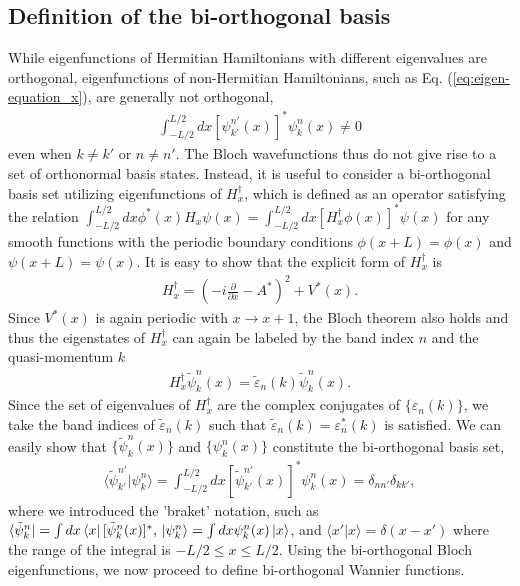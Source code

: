 \documentclass[prb,superscriptaddress,floatfix,twocolumn,showpacs]{revtex4-2}
\begin{document}
\subsection{Definition of the bi-orthogonal basis}
\label{subsec:tight-binding_definition}
While eigenfunctions of Hermitian Hamiltonians with different eigenvalues are orthogonal, eigenfunctions of non-Hermitian Hamiltonians, such as Eq. (\ref{eq:eigen-equation_x}), are generally not orthogonal,
\begin{align}
    \int_{-L/2}^{L/2}dx[\psi_{k'}^{n'}(x)]^\ast\psi_k^n(x)\neq0
    \label{eq:not-orthogonal}
\end{align}
even when $k \neq k'$ or $n \neq n'$.
The Bloch wavefunctions thus do not give rise to a set of orthonormal basis states. 
Instead, it is useful to consider a bi-orthogonal basis set \cite{brody2013biorthogonal} utilizing eigenfunctions of $H_x^\dagger$, which is defined as an operator satisfying the relation $\int_{-L/2}^{L/2}dx\phi^\ast(x)H_x\psi(x)=\int_{-L/2}^{L/2}dx[H_x^\dagger\phi(x)]^\ast\psi(x)$ for any smooth functions with the periodic boundary conditions $\phi (x + L) = \phi(x)$ and $\psi(x + L) = \psi(x)$. 
It is easy to show that the explicit form of $H_x^\dagger$ is
\begin{align}
    H_x^\dagger=\left(-i\frac{\partial}{\partial x}-A^\ast\right)^2+V^\ast(x).
    \label{eq:hamiltonian_dagger}
\end{align}
Since $V^* (x)$ is again periodic with $x \to x + 1$, the Bloch theorem also holds and thus the eigenstates of $H_x^\dagger$ can again be labeled by the band index $n$ and the quasi-momentum $k$
\begin{align}
    H_x^\dagger\tilde{\psi}_k^n(x)=\tilde{\varepsilon}_n(k)\tilde{\psi}_k^n(x).
    \label{eq:eigen-equation_x_dagger}
\end{align}
Since the set of eigenvalues of $H_x^\dagger$ are the complex conjugates of $\{\varepsilon_n(k)\}$, we take the band indices of $\tilde{\varepsilon}_n(k)$ such that  $\tilde{\varepsilon}_n(k)=\varepsilon_n^\ast(k)$ is satisfied. 
We can easily show that $\{\tilde{\psi}_k^n(x)\}$ and $\{\psi_k^n(x)\}$ constitute the bi-orthogonal basis set,
\begin{align}
    \langle\tilde{\psi}_{k'}^{n'}|\psi_k^n\rangle=\int_{-L/2}^{L/2}dx[\tilde{\psi}_{k'}^{n'}(x)]^\ast\psi_k^n(x)=\delta_{nn'}\delta_{kk'},
    \label{eq:bi-orthogonal_bloch-function}
\end{align}
where we introduced the 'braket' notation, such as $\bra{\tilde{\psi}_k^n}=\int dx\bra{x}[\tilde{\psi}_k^n(x)]^\ast,\,\ket{\psi_k^n}=\int dx\psi_k^n(x)\ket{x}$, and $\langle x' | x \rangle = \delta(x-x')$ where the range of the integral is $-L/2 \leq x \leq L/2$. 
Using the bi-orthogonal Bloch eigenfunctions, we now proceed to define bi-orthogonal Wannier functions. 
\end{document}
